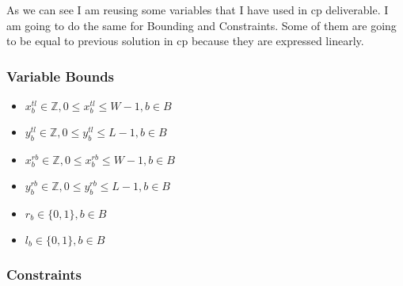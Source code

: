 \documentclass[12pt, a4paper]{article}
\begin{document}
As we can see I am reusing some variables that I have used in \acrfull{cp} deliverable. I am going to do the same for Bounding and Constraints. Some of them are going to be equal to previous solution in \acrshort{cp} because they are expressed linearly.

\subsubsection{Variable Bounds}
\begin{itemize}
  \item $x_b^{tl} \in \mathbb{Z}, 0 \leq x_b^{tl} \leq W-1, b \in B$
  \item $y_b^{tl} \in \mathbb{Z}, 0 \leq y_b^{tl} \leq L-1, b \in B$
  \item $x_b^{rb} \in \mathbb{Z}, 0 \leq x_b^{rb} \leq W-1, b \in B$
  \item $y_b^{rb} \in \mathbb{Z}, 0 \leq y_b^{rb} \leq L-1, b \in B$
  \item $r_b \in \{0,1\}, b \in B$
  \item $l_b \in \{0,1\}, b \in B$
\end{itemize}


\subsubsection{Constraints}
\end{document}
